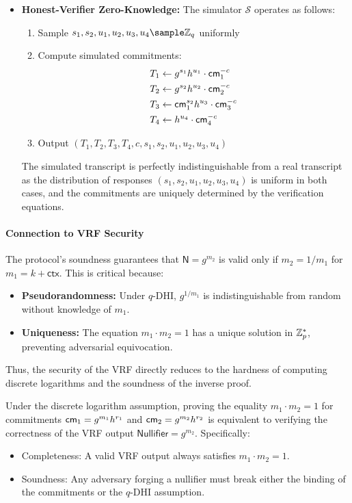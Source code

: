 \begin{itemize}
    \item \textbf{Honest-Verifier Zero-Knowledge:} The simulator $\mathcal{S}$ operates as follows:
    \begin{enumerate}
        \item Sample $s_1, s_2, u_1, u_2, u_3, u_4 \sample \Z_q$ uniformly
        \item Compute simulated commitments:
        \begin{align*}
            T_1 &\gets g^{s_1}h^{u_1} \cdot \mathsf{cm}_1^{-c}\\
            T_2 &\gets g^{s_2}h^{u_2} \cdot \mathsf{cm}_2^{-c}\\
            T_3 &\gets \mathsf{cm}_1^{s_2}h^{u_3} \cdot \mathsf{cm}_3^{-c}\\
            T_4 &\gets h^{u_4} \cdot \mathsf{cm}_4^{-c}
        \end{align*}
        \item Output $(T_1, T_2, T_3, T_4, c, s_1, s_2, u_1, u_2, u_3, u_4)$
    \end{enumerate}
    The simulated transcript is perfectly indistinguishable from a real transcript as the distribution of responses $(s_1, s_2, u_1, u_2, u_3, u_4)$ is uniform in both cases, and the commitments are uniquely determined by the verification equations.
\end{itemize}

\paragraph{Connection to VRF Security}  
The protocol’s soundness guarantees that $\textsf{N} = g^{m_2}$ is valid only if $m_2 = 1/m_1$ for $m_1 = k + \textsf{ctx}$. This is critical because:
\begin{itemize}
    \item \textbf{Pseudorandomness:} Under $q$-DHI, $g^{1/m_1}$ is indistinguishable from random without knowledge of $m_1$.
    \item \textbf{Uniqueness:} The equation $m_1 \cdot m_2 = 1$ has a unique solution in $\mathbb{Z}_p^*$, preventing adversarial equivocation.
\end{itemize}
Thus, the security of the VRF directly reduces to the hardness of computing discrete logarithms and the soundness of the inverse proof.




\begin{theorem}
Under the discrete logarithm assumption, proving the equality $m_1 \cdot m_2 = 1$ for commitments $\mathsf{cm}_1 = g^{m_1}h^{r_1}$ and $\mathsf{cm}_2 = g^{m_2}h^{r_2}$ is equivalent to verifying the correctness of the VRF output $\textsf{Nullifier} = g^{m_2}$. Specifically:
\begin{itemize}
    \item Completeness: A valid VRF output always satisfies $m_1 \cdot m_2 = 1$.
    \item Soundness: Any adversary forging a nullifier must break either the binding of the commitments or the $q$-DHI assumption.
\end{itemize}
\end{theorem}

